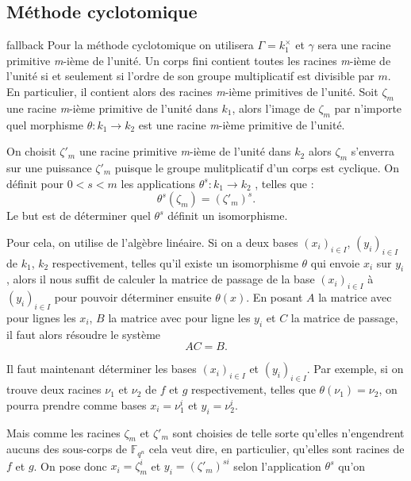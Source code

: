 \documentclass[a4paper]{article} %
\numberwithin{section}{part}
\numberwithin{equation}{section}
\newcommand\nroot[1]{\textit{#1}-ième}
\newcommand\GF[1]{\mathbb{F}_{#1}}
\begin{document}
\subsection{Méthode cyclotomique}
fallback
Pour la méthode cyclotomique on utilisera $\Gamma = k_1^{\times}$ et $\gamma$ 
sera une racine primitive \nroot{m} de l'unité.
Un corps fini contient toutes les racines \nroot{m} de l'unité si et seulement 
si l'ordre de son groupe multiplicatif est divisible par $m$. En particulier, il
contient alors des racines \nroot{m} primitives de l'unité. Soit $\zeta_m$ une
racine \nroot{m} primitive de l'unité dans $k_1$, alors l'image de $\zeta_m$ par
n'importe quel morphisme $\theta : k_1 \to k_2$ est une racine \nroot{m} primitive
de l'unité.\par
On choisit $\zeta'_m$ une racine primitive \nroot{m} de l'unité dans $k_2$
alors $\zeta_m$ s'enverra sur une puissance $\zeta'_m$ puisque le groupe 
mulitplicatif d'un corps est cyclique. On définit pour $0 < s < m$ les
applications $\theta^s : k_1 \to k_2$ , telles que :
\begin{equation}
\theta^s(\zeta_m) = (\zeta'_m)^s.
\end{equation}
Le but est de déterminer quel $\theta^s$ définit un isomorphisme.\par
Pour cela, on utilise de l'algèbre linéaire. Si on a deux bases 
$(x_i)_{i\in I}$, $(y_i)_{i\in I}$ de $k_1$, $k_2$ respectivement, telles 
qu'il existe un isomorphisme $\theta$ qui envoie $x_i$ sur $y_i$, alors il nous
suffit de calculer la matrice de passage de la base $(x_i)_{i\in I}$ à
$(y_i)_{i\in I}$ pour pouvoir déterminer ensuite $\theta(x)$. En posant $A$ la
matrice avec pour lignes les $x_i$, $B$ la matrice avec pour ligne les $y_i$ et
$C$ la matrice de passage, il faut alors résoudre le système 
\begin{equation}
AC = B.
\end{equation}
\par
Il faut maintenant déterminer les bases $(x_i)_{i\in I}$ et $(y_i)_{i\in I}$. 
Par exemple, si on trouve deux racines $\nu_1$ et $\nu_2$ de $f$ et $g$ 
respectivement, telles que $\theta(\nu_1) = \nu_2$, on pourra prendre comme bases 
$x_i = \nu_1^i$ et $y_i = \nu_2^i$.\par
Mais comme les racines $\zeta_m$ et $\zeta'_m$ sont choisies de telle sorte 
qu'elles n'engendrent aucuns des sous-corps de $\GF{q^n}$ cela veut 
dire, en particulier, qu'elles sont racines de $f$ et $g$. On pose donc 
$x_i = \zeta_m^i$ et $y_i = (\zeta'_m)^{si}$ selon l'application $\theta^s$ qu'on 
\end{document}
